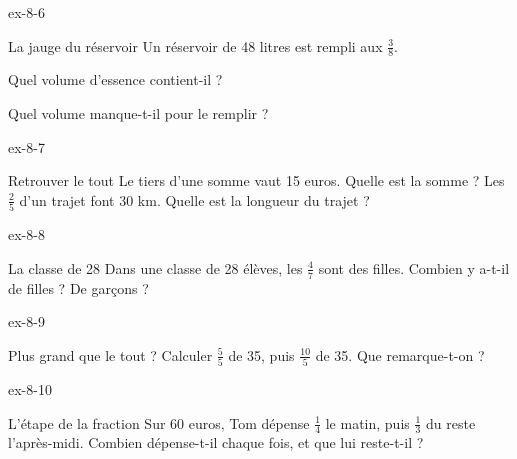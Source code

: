 \begin{blocLivre}{ex-8-6}\begin{exercice}[2]{La jauge du réservoir}
Un réservoir de 48 litres est rempli aux $\frac38$.\begin{questions}
\item Quel volume d’essence contient-il ?
\item Quel volume manque-t-il pour le remplir ?
\end{questions}
\end{exercice}\end{blocLivre}
\begin{blocLivre}{ex-8-7}\begin{exercice}[2]{Retrouver le tout}
Le tiers d’une somme vaut 15 euros. Quelle est la somme ? Les $\frac25$ d’un trajet font 30 km. Quelle est la longueur du trajet ?
\end{exercice}\end{blocLivre}
\begin{blocLivre}{ex-8-8}\begin{exercice}[2]{La classe de 28}
Dans une classe de 28 élèves, les $\frac47$ sont des filles. Combien y a-t-il de filles ? De garçons ?
\end{exercice}\end{blocLivre}
\begin{blocLivre}{ex-8-9}\begin{exercice}[2]{Plus grand que le tout ?}
Calculer $\frac55$ de 35, puis $\frac{10}5$ de 35. Que remarque-t-on ?
\end{exercice}\end{blocLivre}
\begin{blocLivre}{ex-8-10}\begin{exercice}[2]{L’étape de la fraction}
Sur 60 euros, Tom dépense $\frac14$ le matin, puis $\frac13$ du reste l’après-midi. Combien dépense-t-il chaque fois, et que lui reste-t-il ?
\end{exercice}\end{blocLivre}

